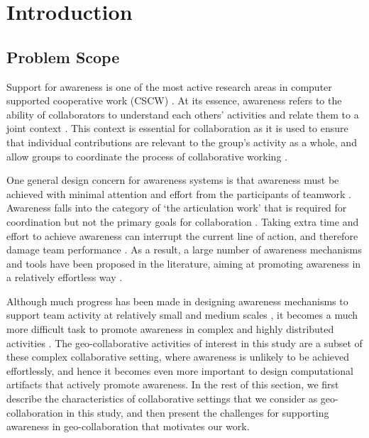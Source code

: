 \graphicspath{{Figures/}}

\chapter{Introduction} 
\label{chapter1:introduction}

\section{Problem Scope}
Support for awareness is one of the most active research areas in computer supported cooperative work (CSCW) \cite{dourish1992awareness,schmidt2002a,rittenbruch2009a}. At its essence, awareness refers to the ability of collaborators to understand each others' activities and relate them to a joint context \cite{rittenbruch2009a}. This context is essential for collaboration as it is used to ensure that individual contributions are relevant to the group’s activity as a whole, and allow groups to coordinate the process of collaborative working \cite{dourish1992awareness}.  

One general design concern for awareness systems is that awareness must be achieved with minimal attention and effort from the participants of teamwork \cite{markopoulos2009design}. Awareness falls into the category of `the articulation work' that is required for coordination but not the primary goals for collaboration  \cite{schmidt1992taking}. Taking extra time and effort to achieve awareness can interrupt the current line of action, and therefore damage team performance \cite{fussell1998coordination}. As a result, a large number of awareness mechanisms and tools have been proposed in the literature, aiming at promoting awareness in a relatively effortless way \cite{rittenbruch2009a}.

Although much progress has been made in designing awareness mechanisms to support team activity at relatively small and medium scales \cite{antunes2010a}, it becomes a much more difficult task to promote awareness in complex and highly distributed activities \cite{cabitza2009promoting}. The geo-collaborative activities of interest in this study are a subset of these complex collaborative setting, where awareness is unlikely to be achieved effortlessly, and hence it becomes even more important to design computational artifacts that actively promote awareness. In the rest of this section, we first describe the characteristics of collaborative settings that we consider as geo-collaboration in this study, and then present the challenges for supporting awareness in geo-collaboration that motivates our work.

